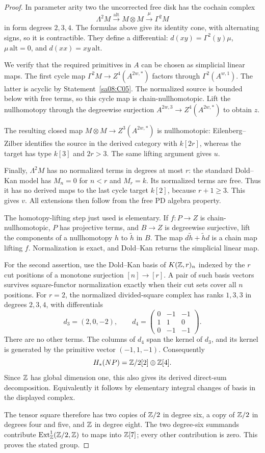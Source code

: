 \begin{proof}
In parameter arity two the uncorrected free
disk has the cochain complex
\[
 \Lambda^2M\xrightarrow{\mathrm{alt}}
 M\otimes M\xrightarrow{\mu}\Gamma^2M
\]
in form degrees $2,3,4$. The formulas above
give its identity cone, with alternating
signs, so it is contractible. They define
a differential: $d(xy)=\Gamma^2(y)\mu$,
$\mu\,\mathrm{alt}=0$, and
$d(xx)=xy\,\mathrm{alt}$.

We verify that the required primitives in
$A$ can be chosen as simplicial linear maps.
The first cycle map
$\Gamma^2M\to Z^4(A^{2w,*})$ factors through
$\Gamma^2(A^{w,1})$. The latter is
acyclic by Statement~\ref{sa08:C05}.
The normalized source is bounded below
with free terms, so this cycle map is
chain-nullhomotopic. Lift the nullhomotopy
through the degreewise surjection
$A^{2w,3}\to Z^4(A^{2w,*})$ to obtain $z$.

The resulting closed map
$M\otimes M\to Z^3(A^{2w,*})$ is nullhomotopic:
Eilenberg--Zilber identifies the source
in the derived category with $k[2r]$,
whereas the target has type $k[3]$ and
$2r>3$. The same lifting argument gives
$u$.

Finally, $\Lambda^2M$ has no normalized
terms in degrees at most $r$: the
standard Dold--Kan model has $M_n=0$
for $n<r$ and $M_r=k$. Its normalized
terms are free. Thus it has no derived
maps to the last cycle target $k[2]$,
because $r+1\geq3$. This gives $v$.
All extensions then follow from the free
PD algebra property.

The homotopy-lifting step just used is
elementary. If $f:P\to Z$ is chain-nullhomotopic,
$P$ has projective terms, and $B\to Z$ is
degreewise surjective, lift the components
of a nullhomotopy $h$ to $\widetilde h$ in
$B$. The map $d\widetilde h+\widetilde h d$
is a chain map lifting $f$. Normalization
is exact, and Dold--Kan returns the
simplicial linear map.

For the second assertion, use the
Dold--Kan basis of $K(\mathbb Z,r)_n$ indexed
by the $r$ cut positions of a monotone
surjection $[n]\to[r]$. A pair of such
basis vectors survives square-functor
normalization exactly when their cut
sets cover all $n$ positions.
For $r=2$, the normalized divided-square
complex has ranks $1,3,3$ in degrees
$2,3,4$, with differentials
\[
 d_3=(2,0,-2),\qquad
 d_4=
 \begin{pmatrix}
 0&-1&-1\\
 1&1&0\\
 0&-1&-1
 \end{pmatrix}.
\]
There are no other terms. The columns
of $d_4$ span the kernel of $d_3$,
and its kernel is generated by the
primitive vector $(-1,1,-1)$.
Consequently
\[
 H_*(NP)=\mathbb Z/2[2]\oplus\mathbb Z[4].
\]
Since $\mathbb Z$ has global dimension one,
this also gives its derived direct-sum
decomposition. Equivalently it follows
by elementary integral changes of
basis in the displayed complex.

The tensor square therefore has two
copies of $\mathbb Z/2$ in degree six, a
copy of $\mathbb Z/2$ in degrees four and
five, and $\mathbb Z$ in degree eight.
The two degree-six summands contribute
$\operatorname{Ext}^1_\mathbb Z(\mathbb Z/2,\mathbb Z)$
to maps into $\mathbb Z[7]$; every other
contribution is zero. This proves
the stated group.
\end{proof}

